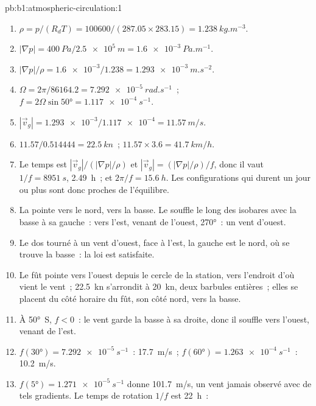 \begin{solution}{pb:b1:atmospheric-circulation:1}
\begin{enumerate}
  \item $\rho = p/(R_dT) = \num{100600}/(287.05 \times 283.15) =
        \qty{1.238}{kg.m^{-3}}$.
  \item $|\nabla p| = \qty{400}{Pa}/\qty{2.5e5}{m} = \qty{1.6e-3}{Pa.m^{-1}}$.
  \item $|\nabla p|/\rho = \num{1.6e-3}/1.238 = \qty{1.293e-3}{m.s^{-2}}$.
  \item $\Omega = 2\pi/\num{86164.2} = \qty{7.292e-5}{rad.s^{-1}}$~;
        $f = 2\Omega\sin\ang{50} = \qty{1.117e-4}{s^{-1}}$.
  \item $|\vec v_g| = \num{1.293e-3}/\num{1.117e-4} = \qty{11.57}{m/s}$.
  \item $11.57/0.514444 = \qty{22.5}{kn}$~; $11.57 \times 3.6 = \qty{41.7}{km/h}$.
  \item Le temps est $|\vec v_g|/(|\nabla p|/\rho)$ et $|\vec v_g| = (|\nabla
        p|/\rho)/f$, donc il vaut $1/f = \qty{8951}{s}$, \qty{2.49}{h}~; et $2\pi/f =
        \qty{15.6}{h}$. Les configurations qui durent un jour ou plus sont donc proches de
        l'équilibre.
  \item La  pointe vers le nord, vers la basse. Le  souffle le long des isobares avec la basse à sa gauche~: vers l'est,
        venant de l'ouest,  \ang{270}~: un vent d'ouest.
  \item Le dos tourné à un vent d'ouest, face à l'est, la gauche est le nord, où se trouve la basse~:
        la loi est satisfaite.
  \item Le fût pointe vers l'ouest depuis le cercle de la station, vers l'endroit d'où vient le vent~;
        \qty{22.5}{kn} s'arrondit à \qty{20}{kn}, deux barbules entières~; elles se placent du
        côté horaire du fût, son côté nord, vers la basse.
  \item À \ang{50}~S, $f < 0$~: le vent garde la basse à sa droite, donc il souffle
        vers l'ouest, venant de l'est.
  \item $f(\ang{30}) = \qty{7.292e-5}{s^{-1}}$~: \qty{17.7}{m/s}~; $f(\ang{60}) =
        \qty{1.263e-4}{s^{-1}}$~: \qty{10.2}{m/s}.
  \item $f(\ang{5}) = \qty{1.271e-5}{s^{-1}}$ donne \qty{101.7}{m/s}, un vent jamais
        observé avec de tels gradients. Le temps de rotation $1/f$ est \qty{22}{h}~:

\end{enumerate}
\end{solution}
